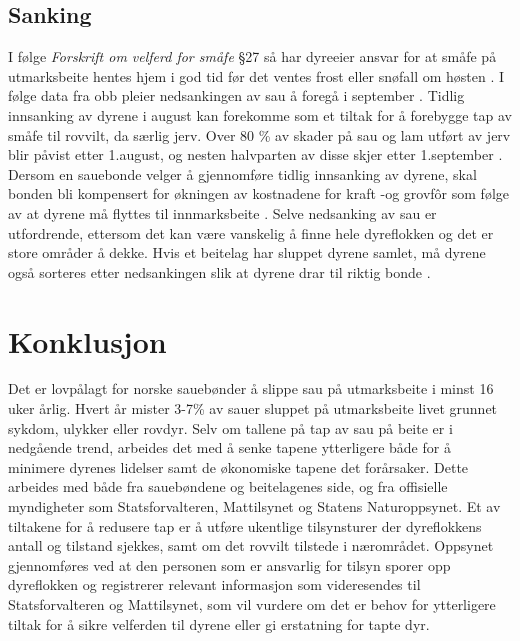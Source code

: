 \subsection{Sanking}
I følge \textit{Forskrift om velferd for småfe} \S 27 så har dyreeier ansvar for at småfe på utmarksbeite hentes hjem i god tid før det ventes frost eller snøfall om høsten \cite{2005ForskriftSmafe}. I følge data fra \acrlong{obb} pleier nedsankingen av sau å foregå i september \cite[~s.8]{Stornes2017TidligInnmarksbeite}. Tidlig innsanking av dyrene i august kan forekomme som et tiltak for å forebygge tap av småfe til rovvilt, da særlig jerv. Over 80 \% av skader på sau og lam utført av jerv blir påvist etter 1.august, og nesten halvparten av disse skjer etter 1.september \cite{Messel2016BondeMedisin}. Dersom en sauebonde velger å gjennomføre tidlig innsanking av dyrene, skal bonden bli kompensert for økningen av kostnadene for kraft -og grovfôr som følge av at dyrene må flyttes til innmarksbeite \cite[~s.10]{Stornes2017TidligInnmarksbeite}. Selve nedsanking av sau er utfordrende, ettersom det kan være vanskelig å finne hele dyreflokken og det er store områder å dekke. Hvis et beitelag har sluppet dyrene samlet, må dyrene også sorteres etter nedsankingen slik at dyrene drar til riktig bonde \cite{NorturaMedlem2016UtformingSA}. 

\section{Konklusjon}
Det er lovpålagt for norske sauebønder å slippe sau på utmarksbeite i minst 16 uker årlig. Hvert år mister 3-7\% av sauer sluppet på utmarksbeite livet grunnet sykdom, ulykker eller rovdyr. Selv om tallene på tap av sau på beite er i nedgående trend, arbeides det med å senke tapene ytterligere både for å minimere dyrenes lidelser samt de økonomiske tapene det forårsaker. Dette arbeides med både fra sauebøndene og beitelagenes side, og fra offisielle myndigheter som Statsforvalteren, Mattilsynet og Statens Naturoppsynet. Et av tiltakene for å redusere tap er å utføre ukentlige tilsynsturer der dyreflokkens antall og tilstand sjekkes, samt om det rovvilt tilstede i nærområdet. Oppsynet gjennomføres ved at den personen som er ansvarlig for tilsyn sporer opp dyreflokken og registrerer relevant informasjon som videresendes til Statsforvalteren og Mattilsynet, som vil vurdere om det er behov for ytterligere tiltak for å sikre velferden til dyrene eller gi erstatning for tapte dyr. 